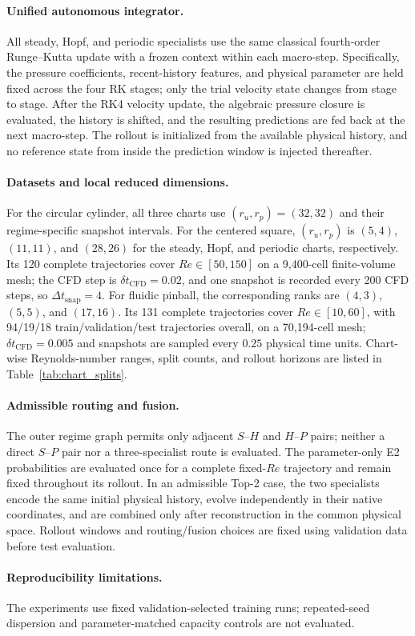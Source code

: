 \paragraph{Unified autonomous integrator.}
All steady, Hopf, and periodic specialists use the same classical fourth-order Runge--Kutta update with a frozen context within each macro-step. Specifically, the pressure coefficients, recent-history features, and physical parameter are held fixed across the four RK stages; only the trial velocity state changes from stage to stage. After the RK4 velocity update, the algebraic pressure closure is evaluated, the history is shifted, and the resulting predictions are fed back at the next macro-step. The rollout is initialized from the available physical history, and no reference state from inside the prediction window is injected thereafter.

\paragraph{Datasets and local reduced dimensions.}
For the circular cylinder, all three charts use $(r_u,r_p)=(32,32)$ and their regime-specific snapshot intervals. For the centered square, $(r_u,r_p)$ is $(5,4)$, $(11,11)$, and $(28,26)$ for the steady, Hopf, and periodic charts, respectively. Its 120 complete trajectories cover $Re\in[50,150]$ on a 9,400-cell finite-volume mesh; the CFD step is $\delta t_{\mathrm{CFD}}=0.02$, and one snapshot is recorded every 200 CFD steps, so $\Delta t_{\mathrm{snap}}=4$. For fluidic pinball, the corresponding ranks are $(4,3)$, $(5,5)$, and $(17,16)$. Its 131 complete trajectories cover $Re\in[10,60]$, with 94/19/18 train/validation/test trajectories overall, on a 70,194-cell mesh; $\delta t_{\mathrm{CFD}}=0.005$ and snapshots are sampled every $0.25$ physical time units. Chart-wise Reynolds-number ranges, split counts, and rollout horizons are listed in Table~\ref{tab:chart_splits}.

\paragraph{Admissible routing and fusion.}
The outer regime graph permits only adjacent $S$--$H$ and $H$--$P$ pairs; neither a direct $S$--$P$ pair nor a three-specialist route is evaluated. The parameter-only E2 probabilities are evaluated once for a complete fixed-$Re$ trajectory and remain fixed throughout its rollout. In an admissible Top-2 case, the two specialists encode the same initial physical history, evolve independently in their native coordinates, and are combined only after reconstruction in the common physical space. Rollout windows and routing/fusion choices are fixed using validation data before test evaluation.

\paragraph{Reproducibility limitations.}
The experiments use fixed validation-selected training runs; repeated-seed dispersion and parameter-matched capacity controls are not evaluated.
